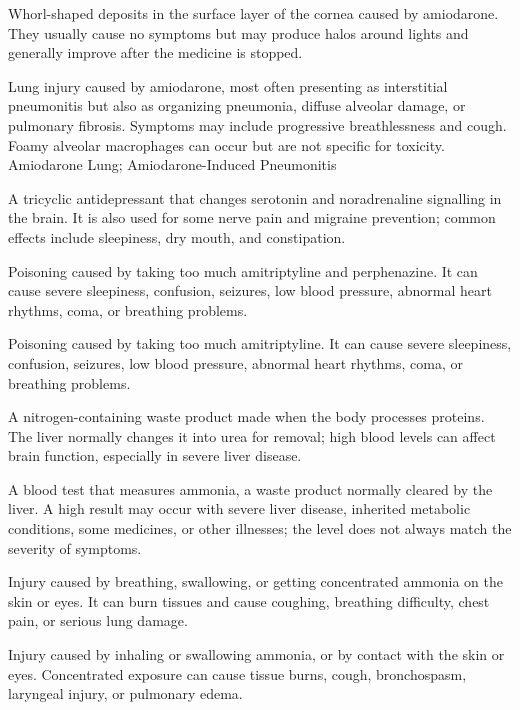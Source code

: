  Whorl-shaped deposits in the surface layer of the cornea caused by amiodarone. They usually cause no symptoms but may produce halos around lights and generally improve after the medicine is stopped.

 Lung injury caused by amiodarone, most often presenting as interstitial pneumonitis but also as organizing pneumonia, diffuse alveolar damage, or pulmonary fibrosis. Symptoms may include progressive breathlessness and cough. Foamy alveolar macrophages can occur but are not specific for toxicity.
\synonyms
Amiodarone Lung; Amiodarone-Induced Pneumonitis

 A tricyclic antidepressant that changes serotonin and noradrenaline signalling in the brain. It is also used for some nerve pain and migraine prevention; common effects include sleepiness, dry mouth, and constipation.

 Poisoning caused by taking too much amitriptyline and perphenazine. It can cause severe sleepiness, confusion, seizures, low blood pressure, abnormal heart rhythms, coma, or breathing problems.

 Poisoning caused by taking too much amitriptyline. It can cause severe sleepiness, confusion, seizures, low blood pressure, abnormal heart rhythms, coma, or breathing problems.

 A nitrogen-containing waste product made when the body processes proteins. The liver normally changes it into urea for removal; high blood levels can affect brain function, especially in severe liver disease.

 A blood test that measures ammonia, a waste product normally cleared by the liver. A high result may occur with severe liver disease, inherited metabolic conditions, some medicines, or other illnesses; the level does not always match the severity of symptoms.

 Injury caused by breathing, swallowing, or getting concentrated ammonia on the skin or eyes. It can burn tissues and cause coughing, breathing difficulty, chest pain, or serious lung damage.

 Injury caused by inhaling or swallowing ammonia, or
by contact with the skin or eyes. Concentrated exposure can cause tissue burns,
cough, bronchospasm, laryngeal injury, or pulmonary edema.

